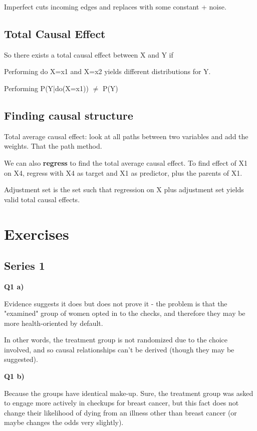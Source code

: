 \documentclass{article}
\begin{document}
	Imperfect cuts incoming edges and replaces with some constant + noise.
	
	\subsection{Total Causal Effect}
	
		So there exists a total causal effect between X and Y if
		
		Performing do X=x1 and X=x2 yields different distributions for Y.
		
		Performing P(Y|do(X=x1)) $\neq$ P(Y)
		
	\subsection{Finding causal structure}
	
		Total average causal effect: look at all paths between two variables and add the weights. That the path method.
		
		We can also \textbf{regress} to find the total average causal effect. To find effect of X1 on X4, regress with X4 as target and X1 as predictor, plus the parents of X1.
		
		Adjustment set is the set such that regression on X plus adjustment set yields valid total causal effects.
		
		
		 
		 
		 
		 
\newpage
\section{Exercises}
	
	\subsection{Series 1}
	
		\textbf{Q1 a)}
		
			Evidence suggests it does but does not prove it - the problem is that the "examined" group of women opted in to the checks, and therefore they may be more health-oriented by default. 
			
			In other words, the treatment group is not randomized due to the choice involved, and so causal relationships can't be derived (though they may be suggested).
			
		\textbf{Q1 b)}
		
			Because the groups have identical make-up. Sure, the treatment group was asked to engage more actively in checkups for breast cancer, but this fact does not change their likelihood of dying from an illness other than breast cancer (or maybe changes the odds very slightly).
			
\end{document}
